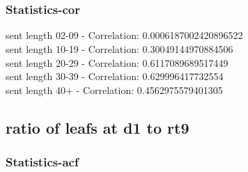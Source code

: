 \documentclass{article}%
\begin{document}
\begin{figure}[ht]%
\centering%
\setlength{\abovecaptionskip}{-35pt}%
%
%
\\%
%
%
\\%
%
\end{figure}

%
\newpage%
\subsubsection{Statistics{-}cor}%
\label{ssubsec:Statistics{-}cor}%
\noindent%
sent length 02-09 - Correlation: 0.0006187002420896522\\%
sent length 10-19 - Correlation: 0.30049144970884506\\%
sent length 20-29 - Correlation: 0.6117089689517449\\%
sent length 30-39 - Correlation: 0.629996417732554\\%
sent length 40+ - Correlation: 0.4562975579401305\\

%
\newpage

%
\subsection{ratio of leafs at d1 to rt9}%
\label{subsec:ratioofleafsatd1tort9}%
\subsubsection{Statistics{-}acf}%
\label{ssubsec:Statistics{-}acf}%
\end{document}
